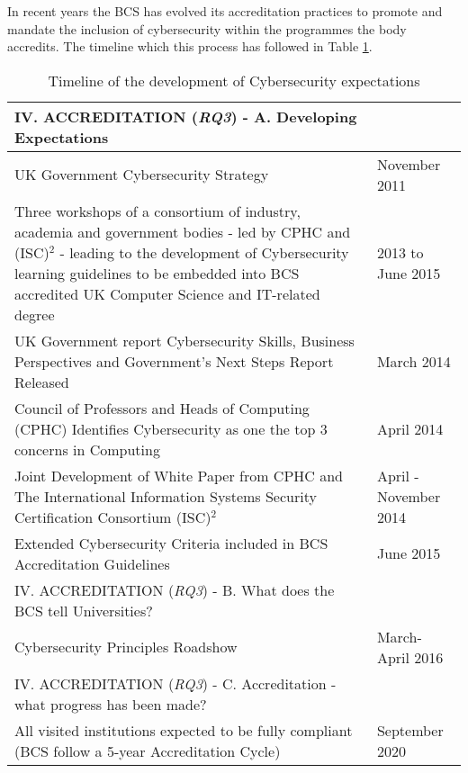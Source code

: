 \documentclass[conference]{IEEEtran}
\begin{document}
In recent years the BCS has evolved its accreditation practices to promote and mandate the inclusion of cybersecurity within the programmes the body accredits. The timeline which this process has followed in Table \ref{table:1}.
  \begin{table}[h!]
  \caption{Timeline of the development of Cybersecurity expectations}
  \label{table:1}
  \begin{tabular}{ | p{6cm} |p{1.5cm} |}
    \hline
    IV. ACCREDITATION ({\emph{RQ3}}) - A. Developing Expectations &  \\ \hline
    UK Government Cybersecurity Strategy \cite{ukcyberstrategy:2016} & November 2011 \\ \hline
    Three workshops of a consortium of industry, academia and government bodies - led by CPHC and  (ISC)$^2$ - leading to the development of Cybersecurity learning guidelines to be embedded into BCS accredited UK Computer Science and IT-related degree \cite{CPHCISC2}  & 2013 to June 2015 \\ \hline
    UK Government report Cybersecurity Skills, Business Perspectives and Government's Next Steps Report Released \cite{UKCabinetOffice2014} & March 2014  \\ \hline
    Council of Professors and Heads of Computing (CPHC) Identifies Cybersecurity as one the top 3 concerns in Computing & April 2014 \\ \hline
    Joint Development of White Paper from CPHC and The International Information Systems Security Certification Consortium (ISC)$^2$ \cite{CPHCISC2014} & April -November 2014 \\ \hline
    Extended Cybersecurity Criteria included in BCS Accreditation Guidelines \cite{BCS2018a}& June 2015 \\
    \hline
    IV. ACCREDITATION ({\emph{RQ3}}) - B. What does the BCS tell Universities? & \\ \hline
    Cybersecurity Principles Roadshow & March-April 2016 \\ \hline
    IV. ACCREDITATION ({\emph{RQ3}}) - C. Accreditation - what progress has been made? &  \\ \hline
    All visited institutions expected to be fully compliant 
 (BCS follow a 5-year Accreditation Cycle)  & September 2020\\ \hline
  \end{tabular}
  \end{table}
\end{document}
